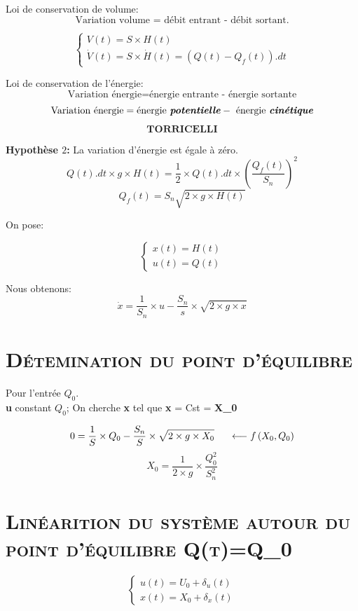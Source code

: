 Loi de conservation de volume:
\[\text{Variation volume $=$ débit entrant - débit sortant.}\]
\begin{center}
$$\left\{
\begin{array}{l}
    V(t)=S\times H(t)\\
    \dot{V}(t)=S\times \dot{H}(t)=(Q(t)-Q_f(t)).dt

\end{array}
\right.$$
\end{center}

Loi de conservation de l'énergie:
\[\text{Variation énergie} = \text{énergie entrante - énergie sortante}\]
\[\text{Variation énergie} = \text{énergie \textit{\textbf{potentielle}}} -\text{ énergie \textit{\textbf{cinétique}}}\]
\[\textbf{TORRICELLI}\]

\textbf{Hypothèse $2$:} \indent La variation d'énergie est égale à zéro.\\
\[Q(t).dt\times g\times H(t)= \frac{1}{2}\times Q(t).dt \times \left(  \frac{Q_f(t)}{S_n}\right)^2\]
\[Q_f(t)=S_n\sqrt{2\times g \times H(t)}\]

On pose: 

$$\left\{
\begin{array}{l}
    x(t)=H(t)\\
    u(t)=Q(t)

\end{array}
\right.$$

Nous obtenons: \[\dot{x}=\frac{1}{S_n}\times u - \frac{S_n}{s}\times \sqrt{2\times g \times x}\]


\section{\textsc{Détemination du point d'équilibre}}
Pour l'entrée $Q_0$.\\
\textbf{u} constant $Q_0$; On cherche \textbf{x} tel que \textbf{x} = Cst = \textbf{X_0}

\[ 0=\frac{1}{S} \times Q_0 - \frac{S_n}{S} \times \sqrt{2 \times g \times X_0} \indent \longleftarrow f\left(X_0,Q_0 \right) \]
\[ X_0 = \frac{1}{2 \times g} \times \frac{Q^2_0}{S^2_n} \]


\section{\textsc{Linéarition du système autour du point d'équilibre Q(t)=Q_0}}

$$\left\{
\begin{array}{l}
    u(t)=U_0+\delta_u(t)\\
    x(t)=X_0+\delta_x(t)
\end{array}
\right.$$

